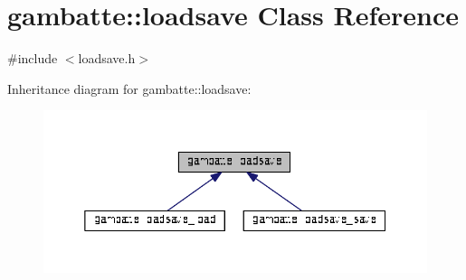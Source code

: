 \hypertarget{classgambatte_1_1loadsave}{}\section{gambatte\+:\+:loadsave Class Reference}
\label{classgambatte_1_1loadsave}


{\ttfamily \#include $<$loadsave.\+h$>$}



Inheritance diagram for gambatte\+:\+:loadsave\+:\nopagebreak
\begin{figure}[H]
\begin{center}
\leavevmode
\includegraphics[width=350pt]{classgambatte_1_1loadsave__inherit__graph}
\end{center}
\end{figure}
